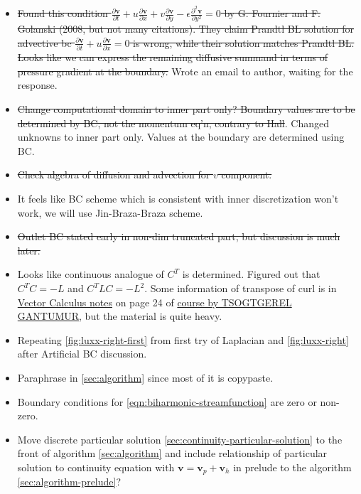 \documentclass{article}
\numberwithin{equation}{section}
\begin{document}
{\begin{itemize}
    \item  \st{Found this condition $\frac{\partial \boldsymbol{v}}{\partial t}+u \frac{\partial \boldsymbol{v}}{\partial x}+v \frac{\partial \boldsymbol{v}}{\partial y}-\epsilon \frac{\partial^2 \boldsymbol{v}}{\partial y^2}=0$ by G. Fournier and F. Golanski (2008, but not many citations). They claim Prandtl BL solution for advective bc $\frac{\partial \boldsymbol{v}}{\partial t} + u\frac{\partial \boldsymbol{v}}{\partial x}=0$ is wrong, while their solution matches Prandtl BL. Looks like we can express the remaining diffusive summand in terms of pressure gradient at the boundary.} Wrote an email to author, waiting for the response. 
    \item \st{Change computational domain to inner part only? Boundary values are to be determined by BC, not the momentum eq'n, contrary to Hall}\cite{Hall:1980}. Changed unknowns to inner part only. Values at the boundary are determined using BC. 
    \item \st{Check algebra of diffusion and advection for $v$ component.} 
    \item It feels like BC scheme which is consistent with inner discretization won't work, we will use Jin-Braza-Braza scheme. 
    \item \st{Outlet BC stated early in non-dim truncated part, but discussion is much later.}
    \item Looks like continuous analogue of $C^T$ is determined. Figured out that $C^TC=-L$ and $C^TLC=-L^2$. Some information of transpose of curl is in \href{https://www.math.mcgill.ca/gantumur/math248f19/vectorcalc.pdf}{Vector Calculus notes} on page 24 of \href{https://www.math.mcgill.ca/gantumur/math248f19/}{course by TSOGTGEREL GANTUMUR}, but the material is quite heavy.
    \item Repeating \cref{fig:luxx-right-first} from first try of Laplacian and \cref{fig:luxx-right} after Artificial BC discussion.
    \item Paraphrase \cite{Gamtumur:2019} in \cref{sec:algorithm} since most of it is copypaste.
    \item Boundary conditions for \cref{eqn:biharmonic-streamfunction} are zero or non-zero.
    \item Move discrete particular solution \cref{sec:continuity-particular-solution} to the front of algorithm \cref{sec:algorithm} and include relationship of particular solution to continuity equation with $\boldsymbol{v}=\boldsymbol{v}_p+\boldsymbol{v}_h$ in prelude to the algorithm \cref{sec:algorithm-prelude}?
  \end{itemize}
}
\end{document}
